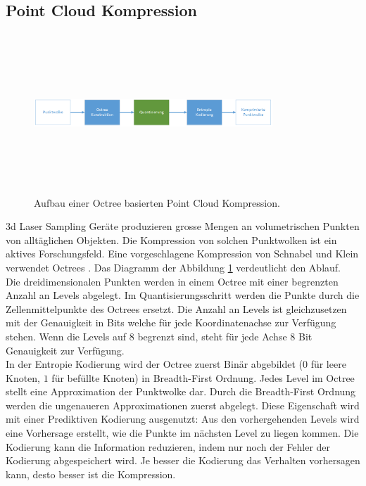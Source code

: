 \subsection{Point Cloud Kompression}
\begin{figure}[!htbp]
	\center
	\includegraphics[width=0.8\textwidth,height=6cm,keepaspectratio]{./pictures/state/pointcloud.png}
	\caption{Aufbau einer Octree basierten Point Cloud Kompression.}
	\label{state:pointcloud:abb}
\end{figure}
3d Laser Sampling Geräte produzieren grosse Mengen an volumetrischen Punkten von alltäglichen Objekten. Die Kompression von solchen Punktwolken ist ein aktives Forschungsfeld. Eine vorgeschlagene Kompression  von Schnabel und Klein \cite{schnabel2006octree} verwendet Octrees \cite{wiki:octree}. Das Diagramm der Abbildung \ref{state:pointcloud:abb} verdeutlicht den Ablauf.\\
Die dreidimensionalen Punkten werden in einem Octree mit einer begrenzten Anzahl an Levels abgelegt. Im Quantisierungsschritt werden die Punkte durch die Zellenmittelpunkte des Octrees ersetzt. Die Anzahl an Levels ist gleichzusetzen mit der Genauigkeit in Bits welche für jede Koordinatenachse zur Verfügung stehen. Wenn die Levels auf $8$ begrenzt sind, steht für jede Achse $8$ Bit Genauigkeit zur Verfügung.\\
In der Entropie Kodierung wird der Octree zuerst Binär abgebildet ($0$ für leere Knoten, $1$ für befüllte Knoten) in Breadth-First Ordnung. Jedes Level im Octree stellt eine Approximation der Punktwolke dar. Durch die Breadth-First Ordnung werden die ungenaueren Approximationen zuerst abgelegt. Diese Eigenschaft wird mit einer Prediktiven Kodierung ausgenutzt: Aus den vorhergehenden Levels wird eine Vorhersage erstellt, wie die Punkte im nächsten Level zu liegen kommen. Die Kodierung kann die Information reduzieren, indem nur noch der Fehler der Kodierung abgespeichert wird. Je besser die Kodierung das Verhalten vorhersagen kann, desto besser ist die Kompression.

